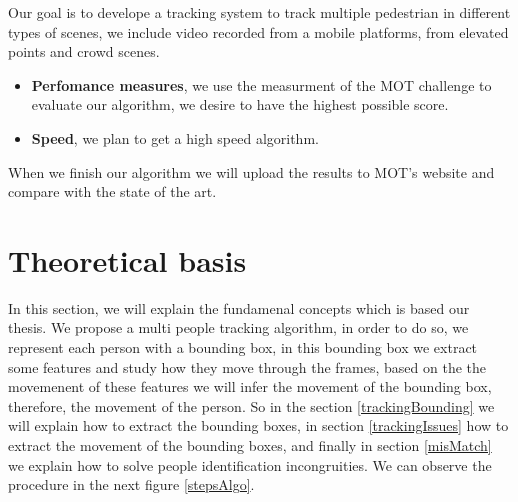 \documentclass[12pt, a4paper, titlepage,twoside,openright]{article}
\begin{document}
Our goal is to develope a tracking system to track multiple pedestrian in different types of scenes, we include video recorded from a mobile platforms, from elevated points and crowd scenes.

\begin{itemize}

\item \textbf{Perfomance measures}, we use the measurment of the MOT \cite{mot} challenge to evaluate our algorithm, we desire to have the highest possible score. 

\item \textbf{Speed}, we plan to get a high speed algorithm.

\end{itemize}

When we finish our algorithm we will upload the results to MOT's website and compare with the state of the art.

\section{Theoretical basis}\label{TheoriecArch}



In this section, we will explain the fundamenal concepts which is based our thesis. We propose a multi people tracking algorithm, in order to do so, we represent each person with a bounding box, in this bounding box we extract some features and study how they move through the frames, based on the the movemenent of these features we will infer the movement of the bounding box, therefore, the movement of the person. So in the section \ref{trackingBounding} we will explain how to extract the bounding boxes, in section \ref{trackingIssues} how to extract the movement of the bounding boxes, and finally in section \ref{misMatch} we explain how to solve people identification incongruities. We can observe the procedure in the next figure \ref{stepsAlgo}.
\end{document}
